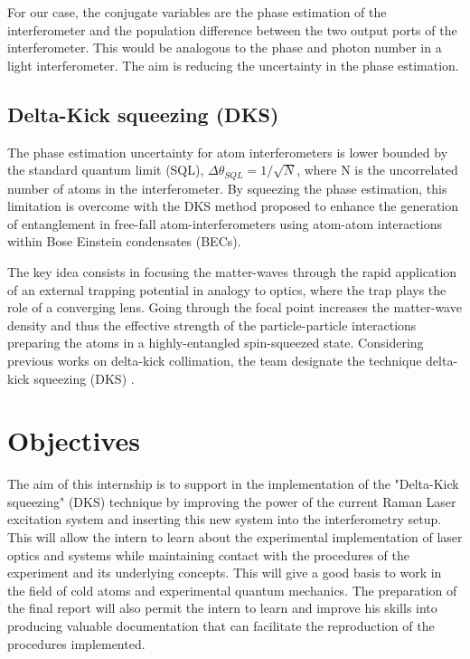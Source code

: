 \documentclass[english, a4paper, 11pt]{article}
\begin{document}
For our case, the conjugate variables are the phase estimation of the interferometer and the population difference between the two output ports of the interferometer. This would be analogous to the phase and photon number in a light interferometer. The aim is reducing the uncertainty in the phase estimation.

\subsection{Delta-Kick squeezing (DKS)}
The phase estimation uncertainty for atom interferometers is lower bounded by the standard quantum limit (SQL), $\Delta \theta_{SQL} = 1/\sqrt{N}$, where N is the uncorrelated number of atoms in the interferometer.
By squeezing the phase estimation, this limitation is overcome with the DKS method proposed to enhance the generation of entanglement in free-fall atom-interferometers using atom-atom interactions within Bose Einstein condensates (BECs).  

The key idea consists in focusing the matter-waves through the rapid application of an external trapping potential in analogy to optics, where the trap plays the role of a converging lens. Going through the focal point increases the matter-wave density and thus the effective strength of the particle-particle interactions preparing the atoms in a highly-entangled spin-squeezed state. Considering previous works on delta-kick collimation, the team designate the technique delta-kick squeezing (DKS)
\cite{Corgier_2021}.

\section{Objectives}

The aim of this internship is to support in the implementation of the "Delta-Kick squeezing" (DKS) technique by improving the power of the current Raman Laser excitation system and inserting this new system into the interferometry setup. This will allow the intern to learn about the experimental implementation of laser optics and systems while maintaining contact with the procedures of the experiment and its underlying concepts. This will give a good basis to work in the field of cold atoms and experimental quantum mechanics. The preparation of the final report will also permit the intern to learn and improve his skills into producing valuable documentation that can facilitate the reproduction of the procedures implemented.
\end{document}
